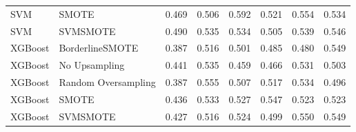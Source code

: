 \begin{tabular}{llllllll}
                         SVM &               SMOTE & 0.469 &                     0.506 &                 0.592 &                  0.521 &                                   0.554 &     0.534 \\
                         SVM &            SVMSMOTE & 0.490 &                     0.535 &                 0.534 &                  0.505 &                                   0.539 &     0.546 \\
                     XGBoost &     BorderlineSMOTE & 0.387 &                     0.516 &                 0.501 &                  0.485 &                                   0.480 &     0.549 \\
                     XGBoost &       No Upsampling & 0.441 &                     0.535 &                 0.459 &                  0.466 &                                   0.531 &     0.503 \\
                     XGBoost & Random Oversampling & 0.387 &                     0.555 &                 0.507 &                  0.517 &                                   0.534 &     0.496 \\
                     XGBoost &               SMOTE & 0.436 &                     0.533 &                 0.527 &                  0.547 &                                   0.523 &     0.523 \\
                     XGBoost &            SVMSMOTE & 0.427 &                     0.516 &                 0.524 &                  0.499 &                                   0.550 &     0.549 \\
\bottomrule
\end{tabular}
